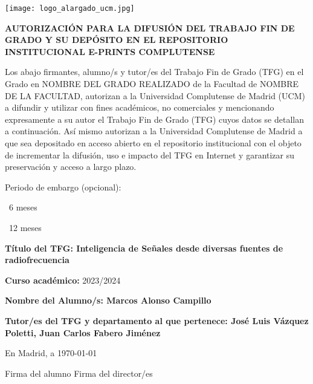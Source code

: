 {
	\newcommand{\checkbox}{{\fboxsep=-.15pt\fbox{\rule{0pt}{1.5ex}\rule{1.5ex}{0pt}}}}
	
	\setlength{\parskip}{14pt}

	\noindent\texttt{[image: logo\_alargado\_ucm.jpg]}
	\vspace{0.5cm}
	\begin{center}
		\textbf{AUTORIZACIÓN PARA LA DIFUSIÓN DEL TRABAJO FIN DE GRADO Y SU DEPÓSITO EN EL REPOSITORIO INSTITUCIONAL E-PRINTS COMPLUTENSE}
	\end{center}
	\vspace{0.5cm}

	\noindent Los abajo firmantes, alumno/s y tutor/es del Trabajo Fin de Grado (TFG) en el Grado en 
	NOMBRE DEL GRADO REALIZADO de la Facultad de NOMBRE DE LA FACULTAD, autorizan a la Universidad Complutense de Madrid (UCM) 
	a difundir y utilizar con fines académicos, no comerciales y mencionando expresamente 
	a su autor el Trabajo Fin de Grado (TFG) cuyos datos se detallan a continuación. 
	Así mismo autorizan a la Universidad Complutense de Madrid a que sea depositado en acceso abierto
	en el repositorio institucional con el objeto de incrementar la difusión, 
	uso e impacto del TFG en Internet y garantizar su preservación y acceso a largo plazo. 

	\noindent Periodo de embargo (opcional): 

	\quad \checkbox\ 6 meses 
	
	\quad \checkbox\ 12 meses 

	\vspace{0.5cm}

	\noindent \textbf{Título del TFG: Inteligencia de Señales desde diversas fuentes de radiofrecuencia}

	\noindent \textbf{Curso académico: } 2023/2024    
	
	\noindent \textbf{Nombre del Alumno/s: Marcos Alonso Campillo}
	
	\noindent \textbf{Tutor/es del TFG y departamento al que pertenece:  José Luis Vázquez Poletti, Juan Carlos Fabero Jiménez}

	\vspace{1cm}

	\begin{center}
		En Madrid, a \today

		\vspace{1cm}

		Firma del alumno \hfill Firma del director/es
	\end{center}
}